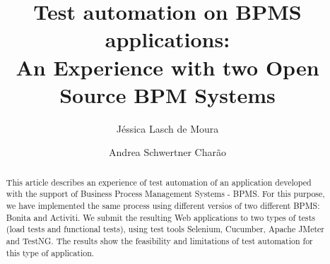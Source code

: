 \documentclass[runningheads,a4paper]{llncs}
\newcommand{\keywords}[1]{\par\addvspace\baselineskip
\noindent\keywordname\enspace\ignorespaces#1}
\begin{document}
\mainmatter  %

\title{
Test automation on BPMS applications: \\ An Experience with two Open Source BPM Systems}


%
%
\author{Jéssica Lasch de Moura
\and Andrea Schwertner Charão}
%


%
%

\maketitle


\begin{abstract}
This article describes an experience of test automation of an application developed with the support of Business Process Management Systems - BPMS. For this purpose, we have implemented the same process using different versios of two different BPMS: Bonita and Activiti. We submit the resulting Web applications to two types of tests (load tests and functional tests), using test tools Selenium, Cucumber, Apache JMeter and TestNG. The results show the feasibility and limitations of test automation for this type of application.

\end{abstract}
\end{document}
